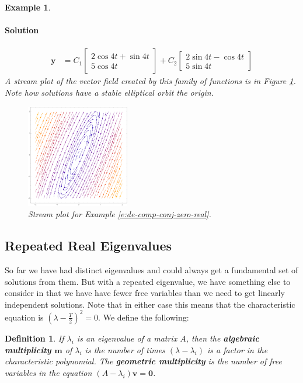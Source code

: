 \documentclass[letterpaper, 11pt, openany]{book}
\theoremstyle{mytheoremstyle}
\newtheorem{definition}{Definition}[section]
\theoremstyle{myexamplestyle}
\newtheorem{example}{Example}[section]
\newenvironment{solution}{\paragraph{\sffamily \smaller \fontseries{b}\selectfont Solution}}{\hfill\faSquare}
\begin{document}
\begin{example}
\begin{solution}
\begin{align*}
            \mathbf{y}  &=C_{1}\begin{bmatrix}2 \cos 4t + \sin 4t \\ 5 \cos 4t\end{bmatrix} + C_{2}\begin{bmatrix}2\sin 4t - \cos 4t \\ 5 \sin 4t\end{bmatrix}                      
        \end{align*}
        A stream plot of the vector field created by this family of functions is in Figure \ref{f:de-comp-conj-zero-real}. Note how solutions have a stable elliptical orbit the origin.
        \begin{figure}[htbp]
            \centering
                \includegraphics[width=0.4\textwidth]{Figures/de-stream-complex-zero-re.pdf}
            \caption{Stream plot for Example \ref{e:de-comp-conj-zero-real}.}
            \label{f:de-comp-conj-zero-real}
        \end{figure}
    \end{solution}
\end{example}

\subsection{Repeated Real Eigenvalues}
So far we have had distinct eigenvalues and could always get a fundamental set of solutions from them. But with a repeated eigenvalue, we have something else to consider in that we have have fewer free variables than we need to get linearly independent solutions. Note that in either case this means that the characteristic equation is \(\left(\lambda - \frac{T}{2}\right)^{2} = 0\). We define the following:

\begin{definition}\label{d:algebraic-geometric-multiplicity}
    If \(\lambda_{i}\) is an eigenvalue of a matrix \(A\), then the \textbf{algebraic multiplicity \(\bm{m}\)} of \(\lambda_{i}\) is the number of times \((\lambda - \lambda_{i})\) is a factor in the characteristic polynomial. The \textbf{geometric multiplicity} is the number of free variables in the equation \((A - \lambda_{i})\mathbf{v} = \mathbf{0}\).
\end{definition}
\end{document}
